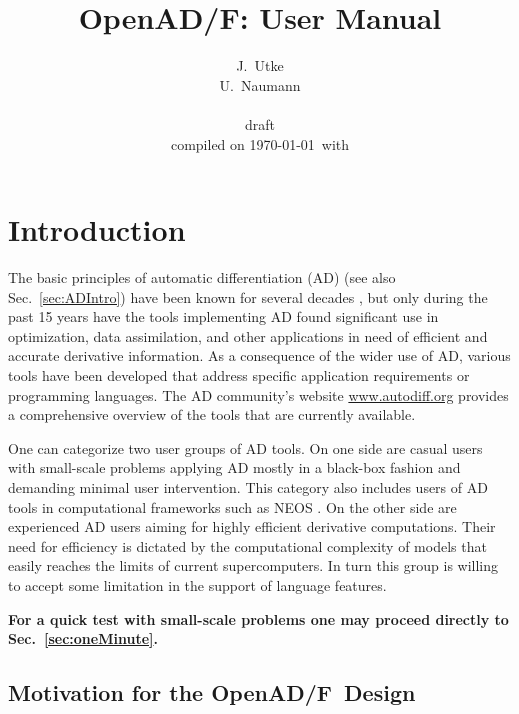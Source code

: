 \documentclass{book}
\title{OpenAD/F: User Manual}
\author{J.~Utke  \\
	U.~Naumann \\\\
\scriptsize draft  \\
\scriptsize compiled on \today\ with \\
\begin{minipage}{3cm}
\tiny

\end{minipage}
}
\date{ }
\newcommand{\OpenADF}{OpenAD/F}
\newcommand{\refsec}[1]{{Sec.~\ref{#1}}}
\begin{document}
\maketitle
\tableofcontents
\listoffigures
\listoftables

\pagestyle{fancy}
\lstset{basicstyle=\small\tt, 
	numbers=left, 
	numberstyle=\scriptsize,
  	stepnumber=1, 
	numbersep=10pt, 
	breaklines=true,
	resetmargins=false,
	xleftmargin=6ex,
	columns=fullflexible}
\chapter{Introduction} \label{chap:Introduction}

The basic principles of automatic differentiation (AD) (see also \refsec{sec:ADIntro})
have been known for several decades \cite{wengert},
but only during the past 15 years have the tools implementing AD found  significant use in 
optimization, data assimilation, and other applications in need of efficient and accurate 
derivative information. 
As a consequence of the wider use of AD, 
various tools have been developed that address specific 
application requirements or programming languages. 
The  AD community's website \url{www.autodiff.org} 
provides a comprehensive overview of the tools that 
are currently available. 

One can categorize two user groups of AD tools. 
On one side are casual users 
with small-scale problems applying AD mostly in a black-box fashion 
and demanding minimal user intervention. 
This category also includes users of AD tools in  computational 
frameworks such as NEOS \cite{neosWeb}.
On the other side are experienced AD users aiming for highly efficient 
derivative computations.
Their need for efficiency is dictated by the 
computational complexity of models that easily reaches the limits of  current 
supercomputers. 
In turn this group is willing to accept some limitation in the support of 
language features. 

\noindent
{\bf {\Large \ForwardToIndex } For a quick test with small-scale problems one may proceed directly to \refsec{sec:oneMinute}.} 

\section{Motivation for the \OpenADF\ Design}
\end{document}
